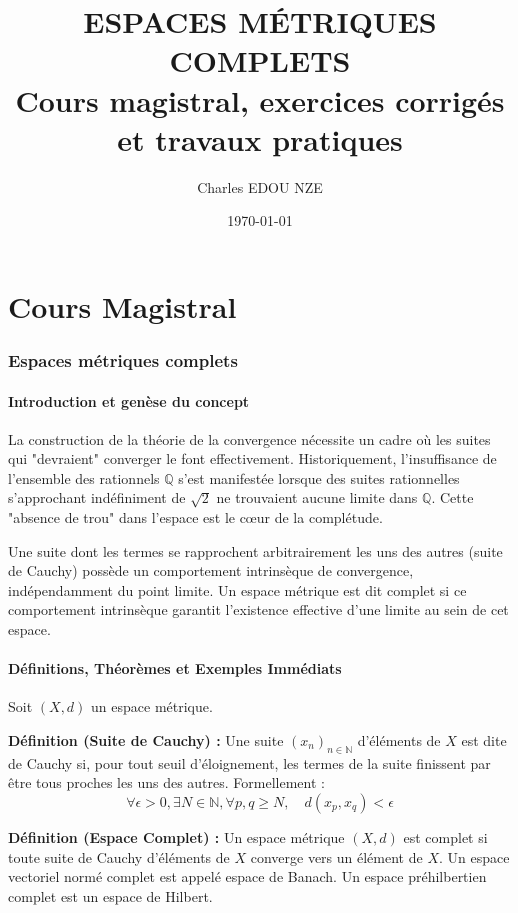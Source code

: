 \documentclass[11pt,a4paper]{article}
\title{\Huge ESPACES MÉTRIQUES COMPLETS \\ \large Cours magistral, exercices corrigés et travaux pratiques}
\author{\Large Charles EDOU NZE}
\date{\today}
\begin{document}
\maketitle
\tableofcontents
\newpage

\part{Cours Magistral}
\section{Espaces métriques complets}

\subsection*{Introduction et genèse du concept}

La construction de la théorie de la convergence nécessite un cadre où les suites qui "devraient" converger le font effectivement. Historiquement, l'insuffisance de l'ensemble des rationnels $\mathbb{Q}$ s'est manifestée lorsque des suites rationnelles s'approchant indéfiniment de $\sqrt{2}$ ne trouvaient aucune limite dans $\mathbb{Q}$. Cette "absence de trou" dans l'espace est le cœur de la complétude.

Une suite dont les termes se rapprochent arbitrairement les uns des autres (suite de Cauchy) possède un comportement intrinsèque de convergence, indépendamment du point limite. Un espace métrique est dit complet si ce comportement intrinsèque garantit l'existence effective d'une limite au sein de cet espace.

\subsection*{Définitions, Théorèmes et Exemples Immédiats}

Soit $(X, d)$ un espace métrique.

\textbf{Définition (Suite de Cauchy) :}
Une suite $(x_n)_{n \in \mathbb{N}}$ d'éléments de $X$ est dite de Cauchy si, pour tout seuil d'éloignement, les termes de la suite finissent par être tous proches les uns des autres. Formellement :
$$ \forall \epsilon > 0, \exists N \in \mathbb{N}, \forall p, q \geq N, \quad d(x_p, x_q) < \epsilon $$

\textbf{Définition (Espace Complet) :}
Un espace métrique $(X, d)$ est complet si toute suite de Cauchy d'éléments de $X$ converge vers un élément de $X$.
Un espace vectoriel normé complet est appelé espace de Banach. Un espace préhilbertien complet est un espace de Hilbert.
\end{document}
